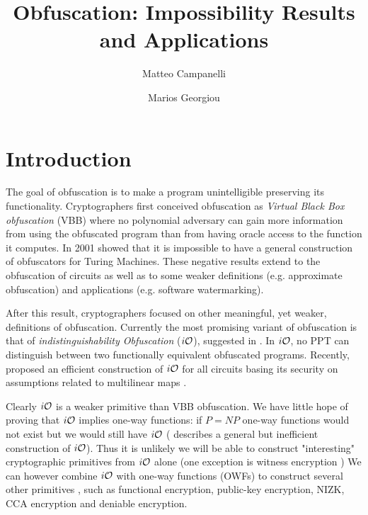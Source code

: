 \documentclass[]{article}
\title{Obfuscation: Impossibility Results and Applications}
\author{Matteo Campanelli \and Marios Georgiou}
\begin{document}
\maketitle

\begin{abstract}


\end{abstract}

\section{Introduction}
The goal of obfuscation is to make a program unintelligible preserving its functionality.
Cryptographers first conceived obfuscation as \emph{Virtual Black Box obfuscation} (VBB) where
no polynomial adversary can gain more information from using the obfuscated program than from having
oracle access to the function it computes. In 2001 \cite{VBB-imp} showed that it is impossible to have a general construction of obfuscators for Turing Machines. These negative results extend to the obfuscation of circuits as well as to some weaker definitions (e.g. approximate obfuscation) and applications (e.g. software watermarking).

After this result, cryptographers focused on other meaningful, yet weaker, definitions of
obfuscation. Currently the most promising variant of obfuscation is that of \emph{indistinguishability Obfuscation} ($i\mathcal{O}$), suggested in \cite{VBB-imp}. In $i\mathcal{O}$, no PPT can distinguish between two functionally equivalent obfuscated programs. Recently, \cite{garg2013candidate} proposed an efficient construction of $i\mathcal{O}$ for all circuits basing its security on assumptions related to multilinear maps \cite{garg2013candidatemulti}.

Clearly $i\mathcal{O}$ is a weaker primitive than VBB obfuscation. We have little hope of proving that $i\mathcal{O}$ implies one-way functions: if $P = NP$ one-way functions would not exist but we would still have $i\mathcal{O}$ (\cite{VBB-imp} describes a general but inefficient construction of $i\mathcal{O}$). 
Thus it is unlikely we will be able to construct "interesting" cryptographic primitives from
$i\mathcal{O}$ alone (one exception is witness encryption \cite{}) %
We can however combine $i\mathcal{O}$ with one-way functions (OWFs) to construct several other primitives \cite{}, such as functional encryption, public-key encryption, NIZK, CCA encryption and deniable encryption. %
\end{document}
